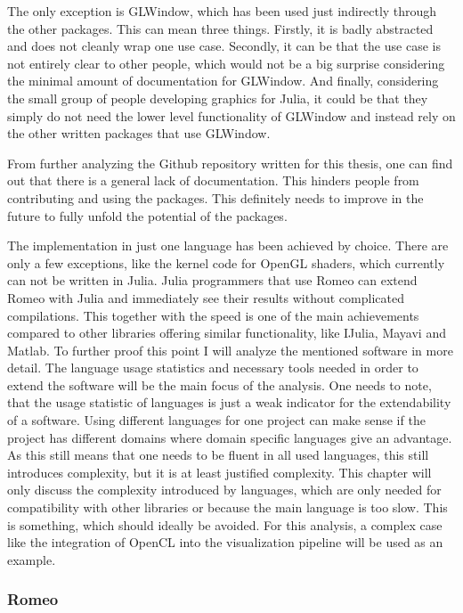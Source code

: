 The only exception is GLWindow, which has been used just indirectly through the other packages. 
This can mean three things.
Firstly, it is badly abstracted and does not cleanly wrap one use case.
Secondly, it can be that the use case is not entirely clear to other people, which would not be a big surprise considering the minimal amount of documentation for GLWindow.
And finally, considering the small group of people developing graphics for Julia, it could be that they simply do not need the lower level functionality of GLWindow and instead rely on the other written packages that use GLWindow.

From further analyzing the Github repository written for this thesis, one can find out that there is a general lack of documentation.
This hinders people from contributing and using the packages. This definitely needs to improve in the future to fully unfold the potential of the packages.

The implementation in just one language has been achieved by choice. 
There are only a few exceptions, like the kernel code for OpenGL shaders, which currently can not be written in Julia. 
Julia programmers that use Romeo can extend Romeo with Julia and immediately see their results without complicated compilations.
This together with the speed is one of the main achievements compared to other libraries offering similar functionality, like IJulia, Mayavi and Matlab.
To further proof this point I will analyze the mentioned software in more detail.
The language usage statistics and necessary tools needed in order to extend the software will be the main focus of the analysis.
One needs to note, that the usage statistic of languages is just a weak indicator for the extendability of a software.
Using different languages for one project can make sense if the project has different domains where domain specific languages give an advantage. 
As this still means that one needs to be fluent in all used languages, this still introduces complexity, but it is at least justified complexity.
This chapter will only discuss the complexity introduced by languages, which are only needed for compatibility with other libraries or because the main language is too slow. 
This is something, which should ideally be avoided.
For this analysis, a complex case like the integration of OpenCL into the visualization pipeline will be used as an example.


\subsubsection{Romeo}

